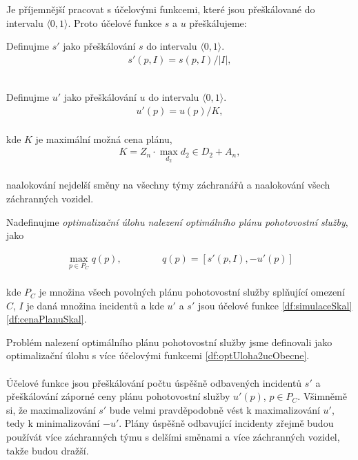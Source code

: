 Je příjemnější pracovat s účelovými funkcemi, které jsou přeškálované do intervalu $\langle 0, 1 \rangle$.
Proto účelové funkce $s$ a $u$ přeškálujeme:

\begin{definice} \label{df:simulaceSkal}
  Definujme $s'$ jako přeškálování $s$ do intervalu $\langle 0, 1 \rangle$.
  \begin{align*}
    s'(p, I) = s(p, I) / |I|,
  \end{align*}
  \\
\end{definice}

\begin{definice} \label{df:cenaPlanuSkal}
  Definujme $u'$ jako přeškálování $u$ do intervalu $\langle 0, 1 \rangle$.
  \begin{align*}
    u'(p) = u(p) / K,
  \end{align*}
  \\
  kde $K$ je maximální možná cena plánu,
  \begin{align*}
    K = Z_n \cdot \max_{d_2} d_2 \in D_2 + A_n,
  \end{align*}
  \\
  naalokování nejdelší směny na všechny týmy záchranářů a naalokování všech záchranných vozidel.
  \\
\end{definice}

Nadefinujme \textit{optimalizační úlohu nalezení optimálního plánu pohotovostní služby}, jako
\\
\begin{definice}\label{df:optUloha2uc}
  \begin{align*}
    \max_{p \in P_C} q(p), \hspace{50pt} q(p) = [s'(p, I), -u'(p)]
  \end{align*}
  \\
  kde $P_C$ je množina všech povolných plánu pohotovostní služby splňující omezení $C$, $I$ je daná množina incidentů
  a kde $u'$ a $s'$ jsou účelové funkce \ref{df:simulaceSkal} \ref{df:cenaPlanuSkal}.
\end{definice}

Problém nalezení optimálního plánu pohotovostní služby jsme definovali jako optimalizační úlohu s více účelovými funkcemi \ref{df:optUloha2ucObecne}.
\\
\\
Účelové funkce jsou přeškálování počtu úspěšně odbavených incidentů $s'$ a přeškálování záporné ceny plánu pohotovostní služby $u'(p)$, $p \in P_C$.
Všimněmě si, že maximalizování $s'$ bude velmi pravděpodobně vést k maximalizování $u'$, tedy k minimalizování $-u'$.
Plány úspěšně odbavující incidenty zřejmě budou používát více záchranných týmu s delšími směnami a více záchranných vozidel, takže budou dražší.

